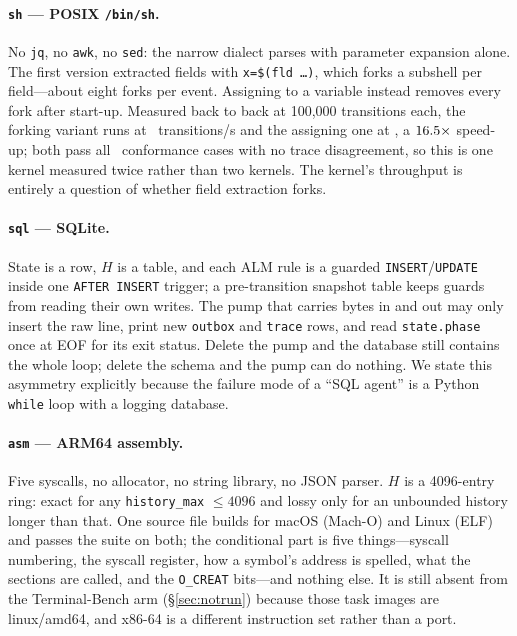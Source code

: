 \documentclass[11pt,a4paper]{article}
\begin{document}
\paragraph{\texttt{sh} --- POSIX \texttt{/bin/sh}.} No \texttt{jq}, no
\texttt{awk}, no \texttt{sed}: the narrow dialect parses with parameter
expansion alone. The first version extracted fields with
\texttt{x=\$(fld \dots)}, which forks a subshell per field---about eight forks
per event. Assigning to a variable instead removes every fork after start-up.
Measured back to back at 100{,}000 transitions each, the forking variant
runs at \forkrate\ transitions/s and the assigning one at \norforkrate, a
$16.5\times$ speed-up; both pass all \confcases\ conformance cases
with no trace disagreement, so this is one kernel measured twice rather than
two kernels. The kernel's
throughput is entirely a question of whether field extraction forks.

\paragraph{\texttt{sql} --- SQLite.} State is a row, $H$ is a table, and each
ALM rule is a guarded \texttt{INSERT}/\texttt{UPDATE} inside one
\texttt{AFTER INSERT} trigger; a pre-transition snapshot table keeps guards from
reading their own writes. The pump that carries bytes in and out may only
insert the raw line, print new \texttt{outbox} and \texttt{trace} rows, and read
\texttt{state.phase} once at EOF for its exit status. Delete the pump and the
database still contains the whole loop; delete the schema and the pump can do
nothing. We state this asymmetry explicitly because the failure mode of a
``SQL agent'' is a Python \texttt{while} loop with a logging database.

\paragraph{\texttt{asm} --- ARM64 assembly.} Five syscalls, no allocator, no
string library, no JSON parser. $H$ is a 4096-entry ring: exact for any
\texttt{history\_max} $\le 4096$ and lossy only for an unbounded history longer
than that. One source file builds for macOS (Mach-O) and Linux (ELF) and
passes the suite on both; the conditional part is five things---syscall
numbering, the syscall register, how a symbol's address is spelled, what the
sections are called, and the \texttt{O\_CREAT} bits---and nothing else. It is
still absent from the Terminal-Bench arm (\S\ref{sec:notrun}) because those
task images are linux/amd64, and x86-64 is a different instruction set rather
than a port.
\end{document}

